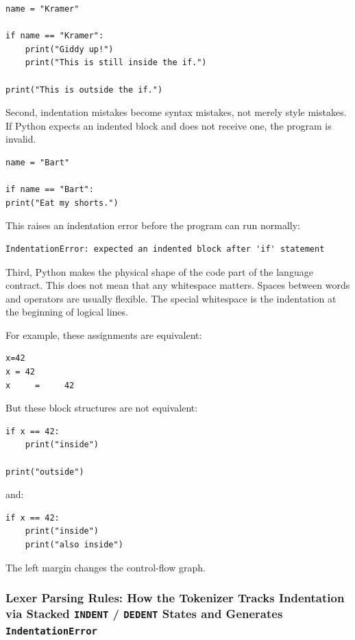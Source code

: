 \documentclass[a4paper,twoside]{report}
\begin{document}
\begin{verbatim}
name = "Kramer"

if name == "Kramer":
    print("Giddy up!")
    print("This is still inside the if.")

print("This is outside the if.")
\end{verbatim}

Second, indentation mistakes become syntax mistakes, not merely style mistakes. If Python expects an indented block and does not receive one, the program is invalid.

\begin{verbatim}
name = "Bart"

if name == "Bart":
print("Eat my shorts.")
\end{verbatim}

This raises an indentation error before the program can run normally:

\begin{verbatim}
IndentationError: expected an indented block after 'if' statement
\end{verbatim}

Third, Python makes the physical shape of the code part of the language contract. This does not mean that any whitespace matters. Spaces between words and operators are usually flexible. The special whitespace is the indentation at the beginning of logical lines.

For example, these assignments are equivalent:

\begin{verbatim}
x=42
x = 42
x     =     42
\end{verbatim}

But these block structures are not equivalent:

\begin{verbatim}
if x == 42:
    print("inside")

print("outside")
\end{verbatim}

and:

\begin{verbatim}
if x == 42:
    print("inside")
    print("also inside")
\end{verbatim}

The left margin changes the control-flow graph.

\subsubsection{Lexer Parsing Rules: How the Tokenizer Tracks Indentation via Stacked \texttt{INDENT} / \texttt{DEDENT} States and Generates \texttt{IndentationError}}
\end{document}
